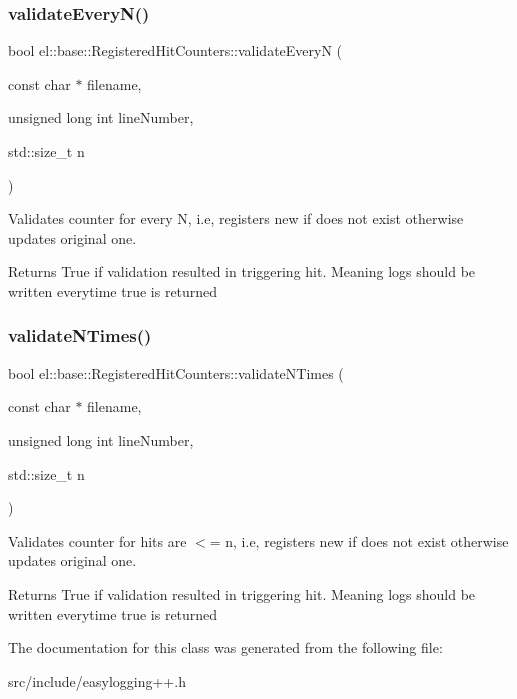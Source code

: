 \subsubsection{\texorpdfstring{validate\+Every\+N()}{validateEveryN()}}
{\footnotesize\ttfamily bool el\+::base\+::\+Registered\+Hit\+Counters\+::validate\+EveryN (\begin{DoxyParamCaption}\item[{const char $\ast$}]{filename,  }\item[{unsigned long int}]{line\+Number,  }\item[{std\+::size\+\_\+t}]{n }\end{DoxyParamCaption})\hspace{0.3cm}{\ttfamily [inline]}}



Validates counter for every N, i.\+e, registers new if does not exist otherwise updates original one. 

\begin{DoxyReturn}{Returns}
True if validation resulted in triggering hit. Meaning logs should be written everytime true is returned 
\end{DoxyReturn}
\mbox{\label{classel_1_1base_1_1_registered_hit_counters_aa270c1b9a8cc3a4d12cea45e07560d98}} 
\subsubsection{\texorpdfstring{validate\+N\+Times()}{validateNTimes()}}
{\footnotesize\ttfamily bool el\+::base\+::\+Registered\+Hit\+Counters\+::validate\+N\+Times (\begin{DoxyParamCaption}\item[{const char $\ast$}]{filename,  }\item[{unsigned long int}]{line\+Number,  }\item[{std\+::size\+\_\+t}]{n }\end{DoxyParamCaption})\hspace{0.3cm}{\ttfamily [inline]}}



Validates counter for hits are $<$= n, i.\+e, registers new if does not exist otherwise updates original one. 

\begin{DoxyReturn}{Returns}
True if validation resulted in triggering hit. Meaning logs should be written everytime true is returned 
\end{DoxyReturn}


The documentation for this class was generated from the following file\+:\begin{DoxyCompactItemize}
\item 
src/include/easylogging++.\+h\end{DoxyCompactItemize}
